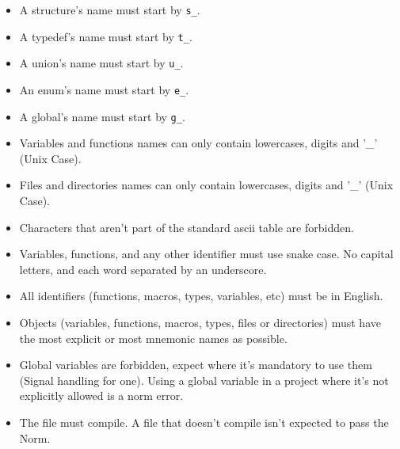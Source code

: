 \documentclass{42-en}
\begin{document}
        \begin{itemize}

            \item A structure's name must start by
                \texttt{s\_}.

            \item A typedef's name must start by
                \texttt{t\_}.

            \item A union's name must start by \texttt{u\_}.

            \item An enum's name must start by \texttt{e\_}.

            \item A global's name must start by \texttt{g\_}.

            \item Variables and functions names can only contain lowercases, digits and
                '\_' (Unix Case).

            \item Files and directories names can only contain lowercases, digits and
                '\_' (Unix Case).

            \item Characters that aren't part of the standard
                ascii table are forbidden.

            \item Variables, functions, and any other identifier must use
                snake case. No capital letters, and each word separated by an 
                underscore.

            \item All identifiers (functions, macros, types,
                variables, etc) must be in English.

            \item Objects (variables, functions, macros, types,
                files or directories) must have the most
                explicit or most mnemonic names as possible.

            \item Global variables are forbidden, expect where it's
                mandatory to use them (Signal handling for one). Using 
                a global variable in a project where it's not explicitly 
                allowed is a norm error.

            \item The file must compile. A file that doesn't compile isn't expected
                to pass the Norm.
        \end{itemize}
\newpage
\end{document}
